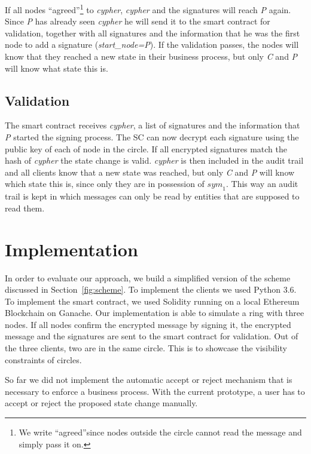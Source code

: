 \documentclass[runningheads]{llncs}
\newcommand{\ber}[1]{\textit{#1}}
\newcommand{\refsec}[1]{Section~\ref{#1}}
\newcommand{\quotel}{``}
\newcommand{\quoter}{''}
\begin{document}
If all nodes \quotel agreed\quoter \footnote{We write \quotel agreed\quoter  since nodes outside the circle cannot read the message and simply pass it on.} to \ber{cypher}, \ber{cypher} and the signatures will reach \ber{P} again. Since \ber{P} has already seen \ber{cypher} he will send it to the smart contract for validation, together with all signatures and the information that he was the first node to add a signature (\ber{start\_node=P}). If the validation passes, the nodes will know that they reached a new state in their business process, but only \ber{C} and \ber{P} will know what state this is.



\subsection{Validation} \label{subsec:furtherinfo}

The smart contract receives \ber{cypher}, a list of signatures and the information that \ber{P} started the signing process. The SC can now decrypt each signature using the public key of each of node in the circle. If all encrypted signatures match the hash of \ber{cypher} the state change is valid. \ber{cypher} is then included in the audit trail and all clients know that a new state was reached, but only \ber{C} and \ber{P} will know which state this is, since only they are in possession of ${sym}_1$. This way an audit trail is kept in which messages can only be read by entities that are supposed to read them.


\section{Implementation} \label{sec:eval}


In order to evaluate our approach, we build a simplified version of the scheme discussed in \refsec{fig:scheme}. To implement the clients we used Python 3.6. To implement the smart contract, we used Solidity running on a local Ethereum Blockchain on Ganache. Our implementation is able to simulate a ring with three nodes. If all nodes confirm the encrypted message by signing it, the encrypted message and the signatures are sent to the smart contract for validation. Out of the three clients, two are in the same circle. This is to showcase the visibility constraints of circles. 

So far we did not implement the automatic accept or reject mechanism that is necessary to enforce a business process. With the current prototype, a user has to accept or reject the proposed state change manually. 
\end{document}
